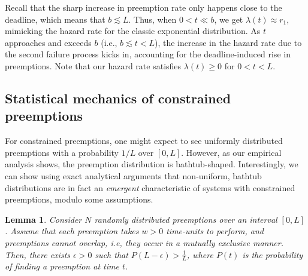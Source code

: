 \documentclass[compsoc]{IEEEtran}
\newtheorem{lemma}{Lemma}
\begin{document}
Recall that the sharp increase in preemption rate only happens close to the deadline, which means that $b \lesssim L$. Thus, when $0 < t \ll b$, we get $\lambda(t) \approx r_1$, mimicking the hazard rate for the classic exponential distribution.
As $t$ approaches and exceeds $b$ (i.e., $b\lesssim t < L$), the increase in the hazard rate due to the second failure process kicks in, accounting for the deadline-induced rise in preemptions. Note that our hazard rate satisfies $\lambda(t) \ge 0$ for $0<t<L$.





\subsection{Statistical mechanics of constrained preemptions}
\label{subsec:stat-mech}

For constrained preemptions, one might expect to see uniformly distributed preemptions with a probability $1/L$ over $[0, L]$. 
However, as our empirical analysis shows, the preemption distribution is bathtub-shaped.
Interestingly, we can show using exact analytical arguments that non-uniform, bathtub distributions are in fact an \emph{emergent} characteristic of systems with constrained preemptions, modulo some assumptions. 

\begin{lemma}\label{lemma:1}
  Consider $N$ randomly distributed preemptions over an interval $[0, L]$.
  Assume that each preemption takes $w > 0$ time-units to perform, and preemptions cannot overlap, i.e, they occur in a mutually exclusive manner.
  Then, there exists $\epsilon > 0$ such that  $P(L-\epsilon) > \frac{1}{L}$, where 
 $P(t)$ is the probability of finding a preemption at time $t$. 
\end{lemma}
\end{document}

